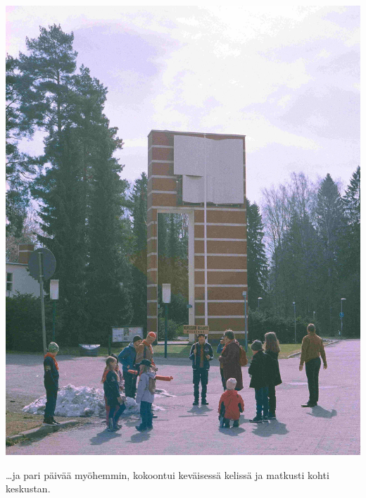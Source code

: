 \begin{multicols}{2}
	\begin{center}
		\noindent\includegraphics[width=0.85\linewidth]{assets/paraati2}
	\end{center}

	\vspace*{-0.32cm}
	\ldots ja pari päivää myöhemmin, kokoontui keväisessä kelissä ja matkusti kohti keskustan.

\end{multicols}
